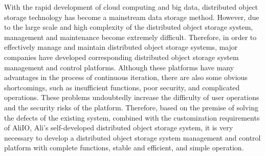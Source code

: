 \begin{abstract*}


  With the rapid development of cloud computing and big data, distributed object storage technology has become a mainstream data storage method. 
  However, due to the large scale and high complexity of the distributed object storage system, management and maintenance become extremely 
  difficult. Therefore, in order to effectively manage and maintain distributed object storage systems, major companies have developed 
  corresponding distributed object storage system management and control platforms. Although these platforms have many advantages in the 
  process of continuous iteration, there are also some obvious shortcomings, such as insufficient functions, poor security, and complicated 
  operations. These problems undoubtedly increase the difficulty of user operations and the security risks of the platform. Therefore, based on 
  the premise of solving the defects of the existing system, combined with the customization requirements of AliIO, Ali's self-developed distributed
  object storage system, it is very necessary to develop a distributed object storage system management and control platform with complete 
  functions, stable and efficient, and simple operation.


\end{abstract*}
